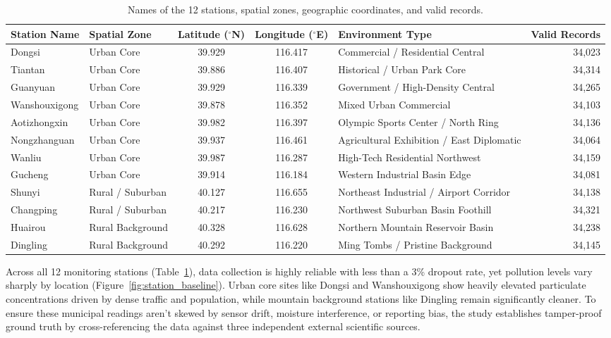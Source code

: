 \documentclass[a4paper,12pt,twocolumn]{article}
\begin{document}
\begin{table}[t]
\centering
\small
\caption{Names of the 12 stations, spatial zones, geographic coordinates, and valid records.}
\label{tab:stations}
\begin{tabularx}{\textwidth}{@{}l l c c X r@{}}
\toprule
Station Name & Spatial Zone & Latitude ($^\circ$N) & Longitude ($^\circ$E) & Environment Type & Valid Records \\
\midrule
Dongsi & Urban Core & 39.929 & 116.417 & Commercial / Residential Central & 34,023 \\
Tiantan & Urban Core & 39.886 & 116.407 & Historical / Urban Park Core & 34,314 \\
Guanyuan & Urban Core & 39.929 & 116.339 & Government / High-Density Central & 34,265 \\
Wanshouxigong & Urban Core & 39.878 & 116.352 & Mixed Urban Commercial & 34,103 \\
Aotizhongxin & Urban Core & 39.982 & 116.397 & Olympic Sports Center / North Ring & 34,136 \\
Nongzhanguan & Urban Core & 39.937 & 116.461 & Agricultural Exhibition / East Diplomatic & 34,064 \\
Wanliu & Urban Core & 39.987 & 116.287 & High-Tech Residential Northwest & 34,159 \\
Gucheng & Urban Core & 39.914 & 116.184 & Western Industrial Basin Edge & 34,081 \\
Shunyi & Rural / Suburban & 40.127 & 116.655 & Northeast Industrial / Airport Corridor & 34,138 \\
Changping & Rural / Suburban & 40.217 & 116.230 & Northwest Suburban Basin Foothill & 34,321 \\
Huairou & Rural Background & 40.328 & 116.628 & Northern Mountain Reservoir Basin & 34,238 \\
Dingling & Rural Background & 40.292 & 116.220 & Ming Tombs / Pristine Background & 34,145 \\
\bottomrule
\end{tabularx}
\end{table}

Across all 12 monitoring stations (Table~\ref{tab:stations}), data collection is highly reliable with less than a 3\% dropout rate, yet pollution levels vary sharply by location (Figure~\ref{fig:station_baseline}). Urban core sites like Dongsi and Wanshouxigong show heavily elevated particulate concentrations driven by dense traffic and population, while mountain background stations like Dingling remain significantly cleaner. To ensure these municipal readings aren't skewed by sensor drift, moisture interference, or reporting bias, the study establishes tamper-proof ground truth by cross-referencing the data against three independent external scientific sources.
\end{document}
